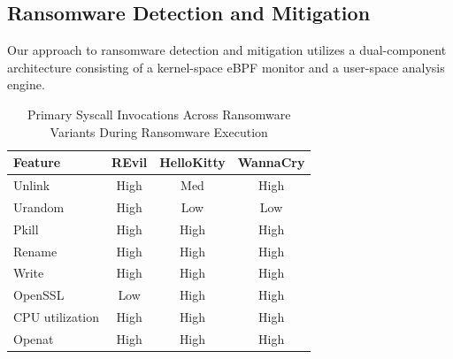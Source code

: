 \documentclass[twocolumn, 10pt]{scrartcl}
\begin{document}
\subsection{Ransomware Detection and Mitigation}
Our approach to ransomware detection and mitigation utilizes a dual-component architecture consisting of a kernel-space eBPF monitor and a user-space analysis engine.
\begin{table}[htbp]
\centering
\begin{tabular}{lccc}
\toprule
\textbf{Feature} & \textbf{REvil} & \textbf{HelloKitty} & \textbf{WannaCry} \\
\midrule
Unlink   & High & Med  & High \\
Urandom  & High & Low  & Low  \\
Pkill    & High & High & High \\
Rename   & High & High & High \\
Write    & High & High & High \\
OpenSSL  & Low  & High & High \\
CPU utilization     & High & High & High \\
Openat   & High & High & High \\
\bottomrule
\end{tabular}
\caption{Primary Syscall Invocations Across Ransomware Variants During Ransomware Execution \cite{sekar2024}}
\label{tab:ransomchar}
\end{table}
\end{document}
